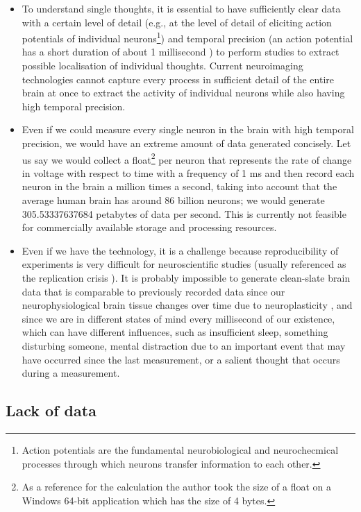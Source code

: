 \begin{itemize}
  \item To understand single thoughts, it is essential to have sufficiently clear data with a certain level of detail (e.g., at the level of detail of eliciting action potentials of individual neurons\footnote{Action potentials are the fundamental neurobiological and neurochecmical processes through which neurons transfer information to each other.}) and temporal precision (an action potential has a short duration of about 1 millisecond \citep{byrne_resting_2021}) to perform studies to extract possible localisation of individual thoughts. Current neuroimaging technologies cannot capture every process in sufficient detail of the entire brain at once to extract the activity of individual neurons while also having high temporal precision.
  \item Even if we could measure every single neuron in the brain with high temporal precision, we would have an extreme amount of data generated concisely. Let us say we would collect a float\footnote{As a reference for the calculation the author took the size of a float on a Windows 64-bit application which has the size of 4 bytes.} per neuron that represents the rate of change in voltage with respect to time with a frequency of 1 ms and then record each neuron in the brain a million times a second, taking into account that the average human brain has around 86 billion neurons; we would generate 305.53337637684 petabytes of data per second. This is currently not feasible for commercially available storage and processing resources.
  \item Even if we have the technology, it is a challenge because reproducibility of experiments is very difficult for neuroscientific studies (usually referenced as the replication crisis \citep{maxwell_is_2015}). It is probably impossible to generate clean-slate brain data that is comparable to previously recorded data since our neurophysiological brain tissue changes over time due to neuroplasticity \citep{puderbaugh_neuroplasticity_2022}, and since we are in different states of mind every millisecond of our existence, which can have different influences, such as insufficient sleep, something disturbing someone, mental distraction due to an important event that may have occurred since the last measurement, or a salient thought that occurs during a measurement.
\end{itemize}

\subsection{Lack of data}
\label{chapter2-lack-of-data}

